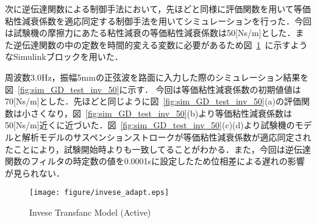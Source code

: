 \documentclass[a4paper,12pt]{article_vdlab_sotsuron}
\begin{document}
\newpage
次に逆伝達関数による制御手法において，先ほどと同様に評価関数を用いて等価粘性減衰係数を適応同定する制御手法を用いてシミュレーションを行った．今回は試験機の摩擦力にあたる粘性減衰の等価粘性減衰係数は50[Ns/m]とした．また逆伝達関数の中の定数を時間的変える変数に必要があるため図~\ref{fig:invese_active}~に示すようなSimulinkブロックを用いた．
\par
周波数3.0Hz，振幅5mmの正弦波を路面に入力した際のシミュレーション結果を図~\ref{fig:sim_GD_test_inv_50}に示す．
今回は等価粘性減衰係数の初期値値は70[Ns/m]とした．先ほどと同じように図~\ref{fig:sim_GD_test_inv_50}(a)の評価関数は小さくなり，図~\ref{fig:sim_GD_test_inv_50}(b)より等価粘性減衰係数は50[Ns/m]近くに近づいた．図~\ref{fig:sim_GD_test_inv_50}(c)(d)より試験機のモデルと解析モデルのサスペンションストロークが等価粘性減衰係数が適応同定されたことにより，試験開始時よりも一致してることがわかる．また，今回は逆伝達関数のフィルタの時定数の値を0.0001sに設定したため位相差による遅れの影響が見られない．
\begin{figure}[htp]
  \begin{center}
    \texttt{[image: figure/invese\_adapt.eps]}
    \vspace*{3mm}
    \caption{Invese Transfanc Model (Active)}
    \label{fig:invese_active}
  \end{center}
\end{figure}
\end{document}
